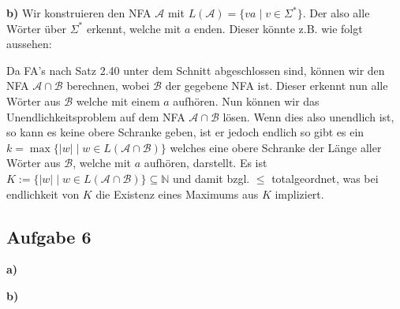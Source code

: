 \documentclass[a4paper,graphics,11pt]{article}
\newcommand{\aufgabe}[1]{\subsection*{Aufgabe #1}}
\begin{document}
\textbf{b)}
Wir konstruieren den NFA $\mathcal{A}$ mit $L(\mathcal{A}) = \{va \mid v \in \Sigma^*\}$. Der also
alle Wörter über $\Sigma^*$ erkennt, welche mit $a$ enden. Dieser könnte z.B. wie folgt aussehen:
\begin{center}
\end{center}
Da FA's nach Satz 2.40 unter dem Schnitt abgeschlossen sind, können wir den NFA $\mathcal{A} \cap \mathcal{B}$
berechnen, wobei $\mathcal{B}$ der gegebene NFA ist. Dieser erkennt nun alle Wörter aus $\mathcal{B}$
welche mit einem $a$ aufhören. Nun können wir das Unendlichkeitsproblem auf dem NFA
$\mathcal{A} \cap \mathcal{B}$ lösen. Wenn dies also unendlich ist, so kann es keine obere Schranke
geben, ist er jedoch endlich so gibt es ein $k = \max\{|w| \mid w \in L(\mathcal{A}\cap \mathcal{B})\}$
welches eine obere Schranke der Länge aller Wörter aus $\mathcal{B}$, welche mit $a$ aufhören, darstellt.
Es ist $K := \{|w| \mid w \in L(\mathcal{A}\cap \mathcal{B})\} \subseteq \mathbb{N}$ und damit bzgl. $\leq$
totalgeordnet, was bei endlichkeit von $K$ die Existenz eines Maximums aus $K$ impliziert.

\newpage
\aufgabe{6}
\textbf{a)}
\begin{center}
\end{center}
\textbf{b)}
\end{document}
